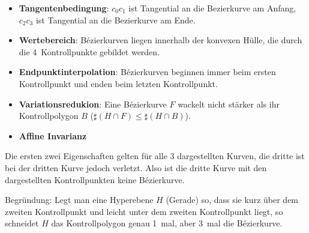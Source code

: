 \documentclass[a4paper]{scrartcl}
\begin{document}
\begin{itemize}
    \item \textbf{Tangentenbedingung}:
          $c_0 c_1$ ist Tangential an die Bezierkurve am Anfang,
          $c_2 c_3$ ist Tangential an die Bezierkurve am Ende.
    \item \textbf{Wertebereich}: Bézierkurven liegen innerhalb der konvexen
          Hülle, die durch die 4~Kontrollpunkte gebildet werden.
    \item \textbf{Endpunktinterpolation}: Bézierkurven beginnen immer beim
          ersten Kontrollpunkt und enden beim letzten Kontrollpunkt.
    \item \textbf{Variationsredukion}: Eine Bézierkurve $F$ wackelt nicht stärker
          als ihr Kontrollpolygon $B$ ($\sharp (H \cap F) \leq \sharp (H \cap B)$).
    \item \textbf{Affine Invarianz}
\end{itemize}

Die ersten zwei Eigenschaften gelten für alle 3 dargestellten Kurven, die
dritte ist bei der dritten Kurve jedoch verletzt. Also ist die dritte Kurve
mit den dargestellten Kontrollpunkten keine Bézierkurve.

Begründung: Legt man eine Hyperebene $H$ (Gerade) so, dass sie kurz über dem
zweiten Kontrollpunkt und leicht unter dem zweiten Kontrollpunkt liegt, so
schneidet $H$ das Kontrollpolygon genau 1~mal, aber 3~mal die Bézierkurve.
\end{document}
